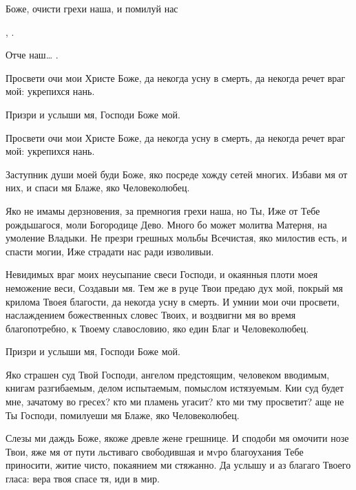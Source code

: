 \begin{mymulticols}
 Боже, очисти грехи наша, и помилуй нас

 , . 

 Отче наш… .



Просвети очи мои Христе Боже, да некогда усну в смерть, да некогда речет враг мой: укрепихся нань.

 Призри и услыши мя, Господи Боже мой. 

 Просвети очи мои Христе Боже, да некогда усну в смерть, да некогда речет враг мой: укрепихся нань.

 Заступник души моей буди Боже, яко посреде хожду сетей многих. Избави мя от них, и спаси мя Блаже, яко Человеколюбец.

 Яко не имамы дерзновения, за премногия грехи наша, но Ты, Иже от Тебе рождьшагося, моли Богородице Дево. Много бо может молитва Матерня, на умоление Владыки. Не презри грешных мольбы Всечистая, яко милостив есть, и спасти могии, Иже страдати нас ради изволивыи.




Невидимых враг моих неусыпание свеси Господи, и окаянныя плоти моея неможение веси, Создавыи мя. Тем же в руце Твои предаю дух мой, покрый мя крилома Твоея благости, да некогда усну в смерть. И умнии мои очи просвети, наслаждением божественных словес Твоих, и воздвигни мя во время благопотребно, к Твоему славословию, яко един Благ и Человеколюбец.

 Призри и услыши мя, Господи Боже мой. 

Яко страшен суд Твой Господи, ангелом предстоящим, человеком вводимым, книгам разгибаемым, делом испытаемым, помыслом истязуемым. Кии суд будет мне, зачатому во гресех? кто ми пламень угасит? кто ми тму просветит? аще не Ты Господи, помилуеши мя Блаже, яко Человеколюбец.

 Слезы ми даждь Боже, якоже древле жене грешнице. И сподоби мя омочити нозе Твои, яже мя от пути льстиваго свободившая и мvро благоухания Тебе приносити, житие чисто, покаянием ми стяжанно. Да услышу и аз благаго Твоего гласа: вера твоя спасе тя, иди в мир.


\end{mymulticols}
